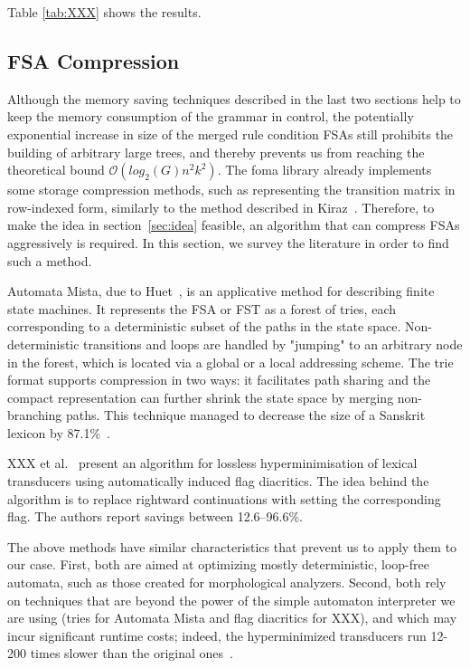 \documentclass{article}
\begin{document}
Table \ref{tab:XXX} shows the results.

\subsection{FSA Compression}

Although the memory saving techniques described in the last two sections help to
keep the memory consumption of the grammar in control, the potentially
exponential increase in size of the merged rule condition FSAs still prohibits
the building of arbitrary large trees, and thereby prevents us from reaching
the theoretical bound $\mathcal{O}(log_2(G)n^2k^2)$. The foma library already
implements some storage compression methods, such as representing the transition
matrix in row-indexed form, similarly to the method described in Kiraz~.
Therefore, to make the idea in section~\ref{sec:idea} feasible, an algorithm that
can compress FSAs aggressively is required. %
In this section, we survey the literature in order to find such a method.

Automata Mista, due to Huet~, is an applicative
method for describing finite state machines. It represents the FSA or FST as
a forest of tries, each corresponding to a deterministic subset of the paths in
the state space. Non-deterministic transitions and loops are handled by
"jumping" to an arbitrary node in the forest, which is located via a global or a
local addressing scheme. The trie format supports compression in two ways: it
facilitates path sharing and the compact representation can further shrink the
state space by merging non-branching paths. This technique managed to decrease
the size of a Sanskrit lexicon by 87.1\%~\cite{Huet:2005}.

XXX et al.~ present an algorithm for lossless
hyperminimisation of lexical transducers using automatically induced flag
diacritics. The idea behind the algorithm is to replace rightward continuations
with setting the corresponding flag. The authors report savings between
12.6--96.6\%.

The above methods have similar characteristics that prevent us to apply them to
our case. First, both are aimed at optimizing mostly deterministic, loop-free
automata, such as those created for morphological analyzers. Second, both rely
on techniques that are beyond the power of the simple automaton interpreter
we are using (tries for Automata Mista and flag diacritics for XXX), and which
may incur significant runtime costs; indeed, the hyperminimized transducers run
12-200 times slower than the original ones~\cite{XXX:2014}. 
\end{document}
